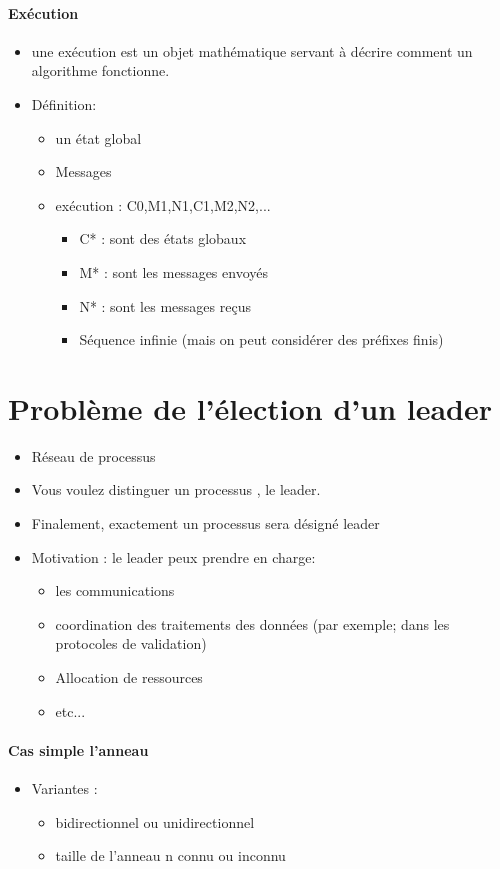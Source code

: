 \documentclass{article}
\begin{document}
\paragraph{Exécution}
\begin{itemize}
\item une exécution est un objet mathématique servant à décrire comment un algorithme fonctionne.
\item Définition: 
\begin{itemize}
\item un état global
\item Messages
\item exécution : C0,M1,N1,C1,M2,N2,...
\begin{itemize}
\item C* : sont des états globaux
\item M*  : sont les messages envoyés
\item N*  : sont les messages reçus
\item Séquence infinie (mais on peut considérer des préfixes finis)
\end{itemize}
\end{itemize}
\end{itemize}
\newpage
\section{Problème de l'élection d'un leader}
\begin{itemize}
\item Réseau de processus
\item Vous voulez distinguer un processus , le leader.
\item Finalement, exactement un processus sera désigné leader
\item Motivation : le leader peux prendre en charge:
\begin{itemize}
\item les communications
\item coordination des traitements des données (par exemple; dans les protocoles de validation)
\item Allocation de ressources
\item etc...
\end{itemize}
\end{itemize}
\paragraph{Cas simple l'anneau}
\begin{itemize}


\item Variantes : \begin{itemize}
\item bidirectionnel ou unidirectionnel
\item taille de l'anneau n connu ou inconnu
\end{itemize}
\end{itemize}
\end{document}
